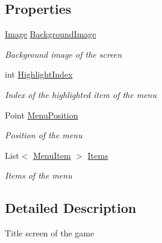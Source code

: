 \subsection*{Properties}
\begin{DoxyCompactItemize}
\item 
\hyperlink{class_hel_project_1_1_u_i_1_1_image}{Image} \hyperlink{class_hel_project_1_1_u_i_1_1_menu_1_1_menu_screen_a3f4d85faa700315baaa4a5f40bf3576e}{Background\+Image}
\begin{DoxyCompactList}\small\item\em Background image of the screen \end{DoxyCompactList}\item 
int \hyperlink{class_hel_project_1_1_u_i_1_1_menu_1_1_menu_screen_ad673eedc194957e3e8ecd157bf954f9c}{Highlight\+Index}
\begin{DoxyCompactList}\small\item\em Index of the highlighted item of the menu \end{DoxyCompactList}\item 
Point \hyperlink{class_hel_project_1_1_u_i_1_1_menu_1_1_menu_screen_a0bd573fd87cbe653e0c8b50fe309de3a}{Menu\+Position}
\begin{DoxyCompactList}\small\item\em Position of the menu \end{DoxyCompactList}\item 
List$<$ \hyperlink{class_hel_project_1_1_u_i_1_1_menu_1_1_menu_item}{Menu\+Item} $>$ \hyperlink{class_hel_project_1_1_u_i_1_1_menu_1_1_menu_screen_a5c4e68d9b5187dde747e872b719d2886}{Items}
\begin{DoxyCompactList}\small\item\em Items of the menu \end{DoxyCompactList}\end{DoxyCompactItemize}


\subsection{Detailed Description}
Title screen of the game 



